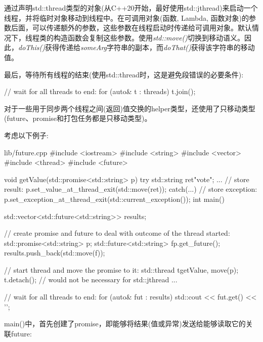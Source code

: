 通过声明std::thread类型的对象(从C++20开始，最好使用std::jthread)来启动一个线程，并将临时对象移动到线程中。在可调用对象(函数, Lambda, 函数对象)的参数后面，可以传递额外的参数，这些参数在线程启动时传递给可调用对象。默认情况下，线程类的构造函数会复制这些参数。使用\textit{std::move()}切换到移动语义。因此，\textit{doThis()}获得传递给\textit{someArg}字符串的副本，而\textit{doThat()}获得该字符串的移动值。\par

最后，等待所有线程的结束(使用std::thread时，这是避免段错误的必要条件):\par

\begin{codebox}[cpp]
// wait for all threads to end:
for (auto& t : threads) {
  t.join();
}
\end{codebox}


对于一些用于同步两个线程之间(返回)值交换的helper类型，还使用了只移动类型(future、promise和打包任务都是只移动类型)。\par

考虑以下例子:\par

\begin{codeboxt}[cpp]{lib/future.cpp}
#include <iostream>
#include <string>
#include <vector>
#include <thread>
#include <future>

void getValue(std::promise<std::string> p)
{
  try {
    std::string ret{"vote"};
    ...
    // store result:
    p.set_value_at_thread_exit(std::move(ret));
  }
  catch(...) {
    // store exception:
    p.set_exception_at_thread_exit(std::current_exception());
  }
}
int main()
{
  std::vector<std::future<std::string>> results;

  // create promise and future to deal with outcome of the thread started:
  std::promise<std::string> p;
  std::future<std::string> f{p.get_future()};
  results.push_back(std::move(f));

  // start thread and move the promise to it:
  std::thread t{getValue, move(p)};
  t.detach(); // would not be necessary for std::jthread
  ...

  // wait for all threads to end:
  for (auto& fut : results) {
    std::cout << fut.get() << '\n';
  }
}
\end{codeboxt}

main()中，首先创建了promise，即能够将结果(值或异常)发送给能够读取它的关联future:\par

